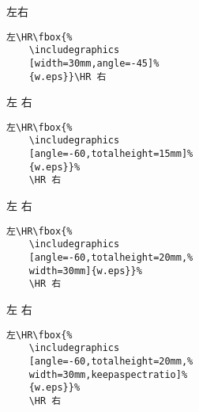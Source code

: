 \hspace{-1cm}\begin{minipage}[c]{.45\textwidth}
	左\HR{}\HR 右
\end{minipage}%
\begin{minipage}[c]{.5\textwidth}
	\begin{Verbatim}[frame=lines,label=\colorbox{green}{\small 例七},labelposition=topline]
	左\HR\fbox{%
	\includegraphics
	[width=30mm,angle=-45]%
	{w.eps}}\HR 右
	\end{Verbatim}
\end{minipage}

\begin{minipage}[c]{.45\textwidth}
	左\HR\fbox{%
		\texttt{[image: w]}}%
	\HR 右
\end{minipage}%
\hspace{-.5cm}\begin{minipage}[c]{.5\textwidth}
	\begin{Verbatim}[frame=lines,label=\colorbox{green}{\small 例八},labelposition=topline]
	左\HR\fbox{%
	\includegraphics
	[angle=-60,totalheight=15mm]%
	{w.eps}}%
	\HR 右
	\end{Verbatim}
\end{minipage}

\begin{minipage}[c]{.45\textwidth}
	左\HR\fbox{%
		\texttt{[image: w]}}%
	\HR 右
\end{minipage}%
\hspace{-.5cm}\begin{minipage}[c]{.5\textwidth}
	\begin{Verbatim}[frame=lines,label=\colorbox{green}{\small 例九},labelposition=topline]
	左\HR\fbox{%
	\includegraphics
	[angle=-60,totalheight=20mm,%
	width=30mm]{w.eps}}%
	\HR 右
	\end{Verbatim}
\end{minipage}

\begin{minipage}[c]{.45\textwidth}
	左\HR\fbox{%
		\texttt{[image: w]}}%
	\HR 右
\end{minipage}%
\hspace{-.5cm}\begin{minipage}[c]{.5\textwidth}
\begin{Verbatim}[frame=lines,label=\colorbox{green}{\small 例十},labelposition=topline]
	左\HR\fbox{%
	\includegraphics
	[angle=-60,totalheight=20mm,%
	width=30mm,keepaspectratio]%
	{w.eps}}%
	\HR 右
\end{Verbatim}
\end{minipage}

